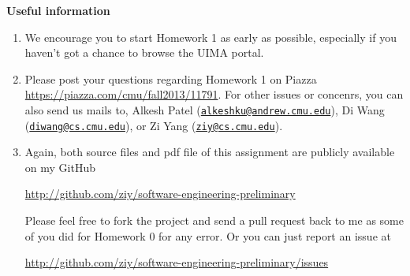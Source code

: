 \documentclass[oneside]{memoir}
\begin{document}
\begin{titlingpage}
\begin{minipage}{1.2\textwidth}
\begin{enumerate}
\end{enumerate}

\textbf{Useful information}
\begin{enumerate}
\item We encourage you to start Homework 1 as early as possible, especially if
you haven't got a chance to browse the UIMA portal.

\item Please post your questions regarding Homework 1 on Piazza
\url{https://piazza.com/cmu/fall2013/11791}. For other issues or concenrs, you
can also send us mails to, Alkesh Patel
(\href{mailto:alkeshku@andrew.cmu.edu}{\nolinkurl{alkeshku@andrew.cmu.edu}}), Di
Wang (\href{mailto:diwang@cs.cmu.edu}{\nolinkurl{diwang@cs.cmu.edu}}), or Zi
Yang (\href{mailto:ziy@cs.cmu.edu}{\nolinkurl{ziy@cs.cmu.edu}}).

\item Again, both source files and pdf file of this assignment are
publicly available on my GitHub

\url{http://github.com/ziy/software-engineering-preliminary}

Please feel free to fork the project and send a pull request back to me as some
of you did for Homework 0 for any error. Or you can just report an issue at

\url{http://github.com/ziy/software-engineering-preliminary/issues}

\end{enumerate}

\end{minipage}
\hspace{-0.1\textwidth}

\end{titlingpage}






\end{document}
